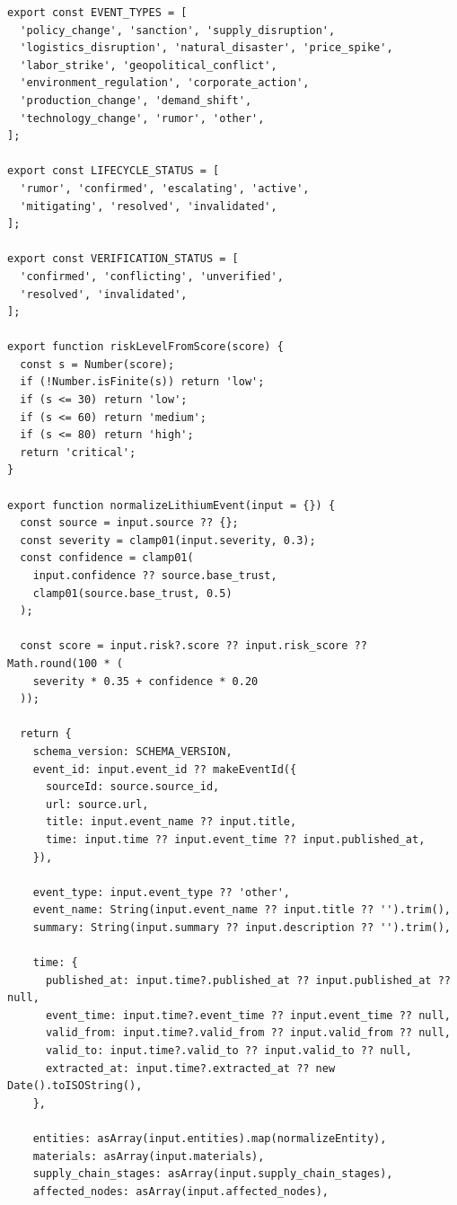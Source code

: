 \documentclass[12pt,a4paper]{article}
\begin{document}
\begin{lstlisting}[style=projectcode,caption={风险事件标准化与 Schema 校验核心实现}]
export const EVENT_TYPES = [
  'policy_change', 'sanction', 'supply_disruption',
  'logistics_disruption', 'natural_disaster', 'price_spike',
  'labor_strike', 'geopolitical_conflict',
  'environment_regulation', 'corporate_action',
  'production_change', 'demand_shift',
  'technology_change', 'rumor', 'other',
];

export const LIFECYCLE_STATUS = [
  'rumor', 'confirmed', 'escalating', 'active',
  'mitigating', 'resolved', 'invalidated',
];

export const VERIFICATION_STATUS = [
  'confirmed', 'conflicting', 'unverified',
  'resolved', 'invalidated',
];

export function riskLevelFromScore(score) {
  const s = Number(score);
  if (!Number.isFinite(s)) return 'low';
  if (s <= 30) return 'low';
  if (s <= 60) return 'medium';
  if (s <= 80) return 'high';
  return 'critical';
}

export function normalizeLithiumEvent(input = {}) {
  const source = input.source ?? {};
  const severity = clamp01(input.severity, 0.3);
  const confidence = clamp01(
    input.confidence ?? source.base_trust,
    clamp01(source.base_trust, 0.5)
  );

  const score = input.risk?.score ?? input.risk_score ?? Math.round(100 * (
    severity * 0.35 + confidence * 0.20
  ));

  return {
    schema_version: SCHEMA_VERSION,
    event_id: input.event_id ?? makeEventId({
      sourceId: source.source_id,
      url: source.url,
      title: input.event_name ?? input.title,
      time: input.time ?? input.event_time ?? input.published_at,
    }),

    event_type: input.event_type ?? 'other',
    event_name: String(input.event_name ?? input.title ?? '').trim(),
    summary: String(input.summary ?? input.description ?? '').trim(),

    time: {
      published_at: input.time?.published_at ?? input.published_at ?? null,
      event_time: input.time?.event_time ?? input.event_time ?? null,
      valid_from: input.time?.valid_from ?? input.valid_from ?? null,
      valid_to: input.time?.valid_to ?? input.valid_to ?? null,
      extracted_at: input.time?.extracted_at ?? new Date().toISOString(),
    },

    entities: asArray(input.entities).map(normalizeEntity),
    materials: asArray(input.materials),
    supply_chain_stages: asArray(input.supply_chain_stages),
    affected_nodes: asArray(input.affected_nodes),


\end{lstlisting}
\end{document}
